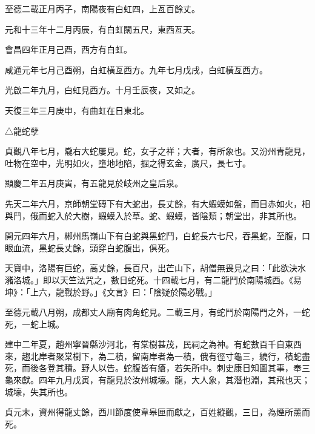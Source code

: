 \begin{pinyinscope}
 至德二載正月丙子，南陽夜有白虹四，上亙百餘丈。



 元和十三年十二月丙辰，有白虹闊五尺，東西亙天。



 會昌四年正月己酉，西方有白虹。



 咸通元年七月己酉朔，白虹橫亙西方。九年七月戊戌，白虹橫亙西方。



 光啟二年九月，白虹見西方。十月壬辰夜，又如之。



 天復三年三月庚申，有曲虹在日東北。



 △龍蛇孽



 貞觀八年七月，隴右大蛇屢見。蛇，女子之祥；大者，有所象也。又汾州青龍見，吐物在空中，光明如火，墮地地陷，掘之得玄金，廣尺，長七寸。



 顯慶二年五月庚寅，有五龍見於岐州之皇后泉。



 先天二年六月，京師朝堂磚下有大蛇出，長丈餘，有大蝦蟆如盤，而目赤如火，相與鬥，俄而蛇入於大樹，蝦蟆入於草。蛇、蝦蟆，皆陰類；朝堂出，非其所也。



 開元四年六月，郴州馬嶺山下有白蛇與黑蛇鬥，白蛇長六七尺，吞黑蛇，至腹，口眼血流，黑蛇長丈餘，頭穿白蛇腹出，俱死。



 天寶中，洛陽有巨蛇，高丈餘，長百尺，出芒山下，胡僧無畏見之曰：「此欲決水瀦洛城。」即以天竺法咒之，數日蛇死。十四載七月，有二龍鬥於南陽城西。《易坤》：「上六，龍戰於野。」《文言》曰：「陰疑於陽必戰。」



 至德元載八月朔，成都丈人廟有肉角蛇見。二載三月，有蛇鬥於南陽門之外，一蛇死，一蛇上城。



 建中二年夏，趙州寧晉縣沙河北，有棠樹甚茂，民祠之為神。有蛇數百千自東西來，趨北岸者聚棠樹下，為二積，留南岸者為一積，俄有徑寸龜三，繞行，積蛇盡死，而後各登其積。野人以告。蛇腹皆有瘡，若矢所中。刺史康日知圖其事，奉三龜來獻。四年九月戊寅，有龍見於汝州城壕。龍，大人象，其潛也淵，其飛也天；城壕，失其所也。



 貞元末，資州得龍丈餘，西川節度使韋皋匣而獻之，百姓縱觀，三日，為煙所薰而死。




\end{pinyinscope}
